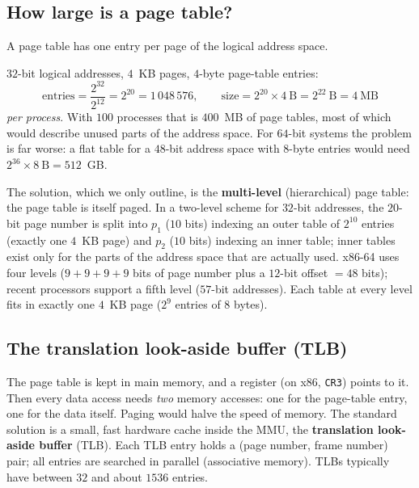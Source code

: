 \documentclass[11pt,a4paper]{article}
\newcommand{\term}[1]{\textbf{\color{mintdeep}#1}}
\begin{document}
\subsection{How large is a page table?}

A page table has one entry per page of the logical address space.

\begin{example}
$32$-bit logical addresses, $4$~KB pages, $4$-byte page-table entries:
\[
\text{entries} = \frac{2^{32}}{2^{12}} = 2^{20} = 1\,048\,576,
\qquad
\text{size} = 2^{20} \times 4\ \text{B} = 2^{22}\ \text{B} = 4\ \text{MB}
\]
\emph{per process}. With $100$ processes that is $400$~MB of page tables, most of which would describe unused parts of the address space. For $64$-bit systems the problem is far worse: a flat table for a $48$-bit address space with $8$-byte entries would need $2^{36} \times 8\ \text{B} = 512$~GB.
\end{example}

The solution, which we only outline, is the \term{multi-level} (hierarchical) page table: the page table is itself paged. In a two-level scheme for $32$-bit addresses, the $20$-bit page number is split into $p_1$ ($10$ bits) indexing an outer table of $2^{10}$ entries (exactly one $4$~KB page) and $p_2$ ($10$ bits) indexing an inner table; inner tables exist only for the parts of the address space that are actually used. x86-64 uses four levels ($9+9+9+9$ bits of page number plus a $12$-bit offset $=48$ bits); recent processors support a fifth level ($57$-bit addresses). Each table at every level fits in exactly one $4$~KB page ($2^{9}$ entries of $8$ bytes).

\subsection{The translation look-aside buffer (TLB)}

The page table is kept in main memory, and a register (on x86, \texttt{CR3}) points to it. Then every data access needs \emph{two} memory accesses: one for the page-table entry, one for the data itself. Paging would halve the speed of memory. The standard solution is a small, fast hardware cache inside the MMU, the \term{translation look-aside buffer} (TLB). Each TLB entry holds a (page number, frame number) pair; all entries are searched in parallel (associative memory). TLBs typically have between $32$ and about $1536$ entries.
\end{document}
